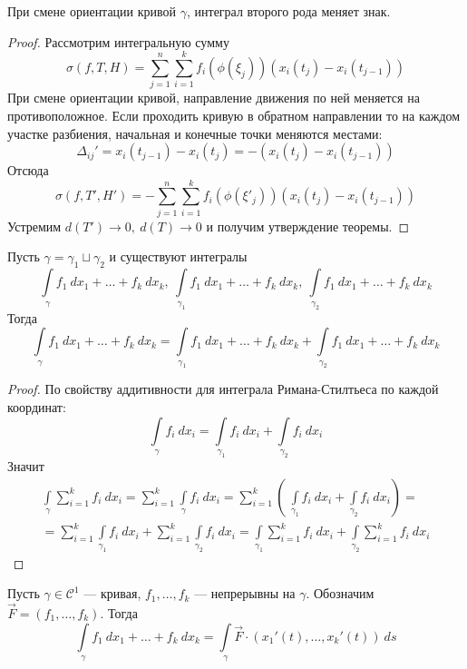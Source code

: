 \begin{statement}
    При смене ориентации кривой $\gamma$, интеграл второго рода меняет знак.
\end{statement}
\begin{proof}
    Рассмотрим интегральную сумму
    \[\sigma(f,T,H)=\sum\limits_{j=1}^{n}\sum\limits_{i=1}^{k}f_i(\phi(\xi_j)) (x_i(t_j)-x_i(t_{j-1}))\]
    При смене ориентации кривой, направление движения по ней меняется на противоположное. Если проходить кривую в обратном направлении то на каждом участке разбиения, начальная и конечные точки меняются местами:
    \[\Delta_{ij}'=x_i(t_{j-1})-x_i(t_j)=-(x_i(t_j)-x_i(t_{j-1}))\]
    Отсюда
    \[\sigma(f,T',H')=-\sum\limits_{j=1}^{n}\sum\limits_{i=1}^{k}f_i(\phi(\xi'_j)) (x_i(t_j)-x_i(t_{j-1}))\]
    Устремим $d(T')\to 0,\ d(T)\to 0$ и получим утверждение теоремы.
\end{proof}
\begin{statement}
    Пусть $\gamma=\gamma_1\sqcup\gamma_2$ и существуют интегралы
    \[\int\limits_{\gamma}f_1\ dx_1+\dots+f_k\ dx_k,\ \int\limits_{\gamma_1}f_1\ dx_1+\dots+f_k\ dx_k,\ \int\limits_{\gamma_2}f_1\ dx_1+\dots+f_k\ dx_k\]
    Тогда 
    \[\int\limits_{\gamma}f_1\ dx_1+\dots+f_k\ dx_k=\int\limits_{\gamma_1}f_1\ dx_1+\dots+f_k\ dx_k+\int\limits_{\gamma_2}f_1\ dx_1+\dots+f_k\ dx_k\]
\end{statement}
\begin{proof}
    По свойству аддитивности для интеграла Римана-Стилтьеса по каждой координат:
    \[\int\limits_{\gamma}f_i\ dx_i=\int\limits_{\gamma_1}f_i\ dx_i+\int\limits_{\gamma_2}f_i\ dx_i\]
    Значит
    \begin{multline*}
        \int\limits_{\gamma}\sum\limits_{i=1}^{k}f_i\ dx_i=\sum\limits_{i=1}^{k}\int\limits_{\gamma}f_i\ dx_i=\sum\limits_{i=1}^{k}\left(\ \int\limits_{\gamma_1}f_i\ dx_i+\int\limits_{\gamma_2}f_i\ dx_i\right)=\\
        =\sum\limits_{i=1}^{k}\int\limits_{\gamma_1}f_i\ dx_i+\sum\limits_{i=1}^{k}\int\limits_{\gamma_2}f_i\ dx_i=\int\limits_{\gamma_1}\sum\limits_{i=1}^{k}f_i\ dx_i+\int\limits_{\gamma_2}\sum\limits_{i=1}^{k}f_i\ dx_i
    \end{multline*}
\end{proof}
\begin{statement}
    Пусть $\gamma\in \mathcal{C}^1$ --- кривая, $f_1,\dots,f_k$ --- непрерывны на $\gamma$. Обозначим $\vec{F}=(f_1,\dots,f_k)$. Тогда
    \[\int\limits_{\gamma}f_1\ dx_1+\dots+f_k\ dx_k=\int\limits_{\gamma}\vec{F}\cdot (x_1'(t),\dots,x_k'(t))\ ds\]
\end{statement}
